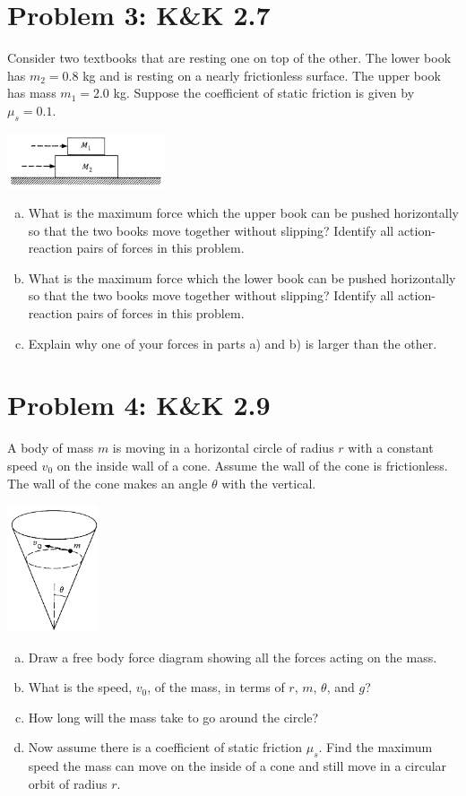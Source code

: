 \documentclass[problems]{esg8012pset}
\begin{document}
\section*{Problem 3: K\&K 2.7}
  Consider two textbooks that are resting one on top of the other. The lower book has $m_2 = 0.8$ kg and is resting on a nearly frictionless surface. The upper book has mass $m_1 = 2.0$ kg. Suppose the coefficient of static friction is given by $\mu_s = 0.1$.
  \begin{center}\includegraphics[width=0.35\textwidth]{ps02_2}\end{center}
  \begin{enumerate}[a)]
    \item What is the maximum force which the upper book can be pushed horizontally so that the two books move together without slipping? Identify all action-reaction pairs of forces in this problem.
    \item What is the maximum force which the lower book can be pushed horizontally so that the two books move together without slipping? Identify all action-reaction pairs of forces in this problem.
    \item Explain why one of your forces in parts a) and b) is larger than the other.
  \end{enumerate}
\section*{Problem 4: K\&K 2.9}
  A body of mass $m$ is moving in a horizontal circle of radius $r$ with a constant speed $v_0$ on the inside wall of a cone. Assume the wall of the cone is frictionless. The wall of the cone makes an angle $\theta$ with the vertical.
  \begin{center}\includegraphics[width=0.2\textwidth]{ps02_3}\end{center}
  \begin{enumerate}[a)]
    \item Draw a free body force diagram showing all the forces acting on the mass.
    \item What is the speed, $v_0$, of the mass, in terms of $r$, $m$, $\theta$, and $g$?
    \item How long will the mass take to go around the circle?
    \item Now assume there is a coefficient of static friction $\mu_s$. Find the maximum speed the mass can move on the inside of a cone and still move in a circular orbit of radius $r$.
  \end{enumerate}
\end{document}
